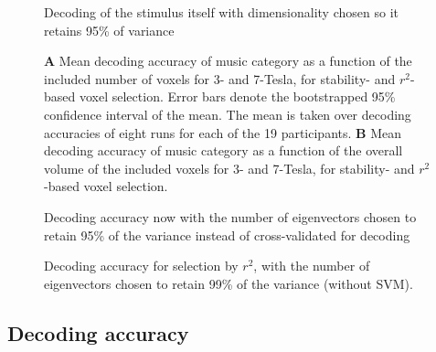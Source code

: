 \begin{figure}
  \centering
  \def\svgwidth{\linewidth}
  
	
  \caption{ Decoding of the stimulus itself with dimensionality chosen so it
    retains 95\% of variance  }

 \label{fig:decoding_accuracy_stimulus}
\end{figure}

\begin{figure}
  \centering
  \def\svgwidth{\linewidth}
  
	
  \caption{\textbf{A} Mean decoding accuracy of music category as a function of
  the included number of voxels for 3- and 7-Tesla, for stability- and
  $r^2$-based voxel selection. Error bars denote the bootstrapped 95\%
  confidence interval of the mean. The mean is taken over decoding
  accuracies of eight runs for each of the 19 participants. \textbf{B} Mean
decoding accuracy of music category as a function of the overall volume of the
included voxels for 3- and 7-Tesla, for stability- and $r^2$-based voxel
selection.
}

 \label{fig:decoding_accuracy}
\end{figure}

\begin{figure}
  \centering
  \def\svgwidth{\linewidth}
  
	
  \caption{ Decoding accuracy now with the number of eigenvectors chosen to
  retain 95\% of the variance instead of cross-validated for decoding }

 \label{fig:decoding_accuracy_var95}
\end{figure}

\begin{figure}
  \centering
  \def\svgwidth{\linewidth}
  
	
  \caption{ Decoding accuracy for selection by $r^2$, with the number of eigenvectors chosen to
	  retain 99\% of the variance (without SVM). }

 \label{fig:decoding_accuracy_var99}
\end{figure}


\subsection*{Decoding accuracy}

